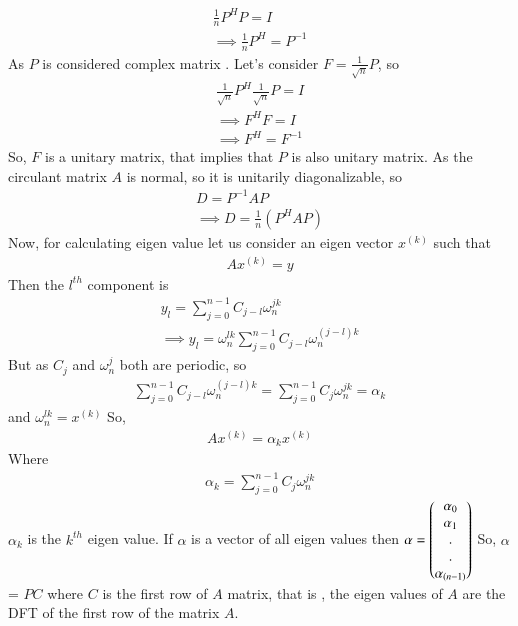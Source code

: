 \documentclass[journal,12pt,twocolumn]{IEEEtran}
\renewcommand\thesection{\arabic{section}}
\begin{document}
\begin{align}
\frac{1}{n}P^H P=I\\
\implies \frac{1}{n}P^H = P^{-1}
\end{align}  
As $P$ is considered complex matrix .
Let's consider $F = \frac{1}{\sqrt{n}}P$, so 
\begin{align}
\frac{1}{\sqrt{n}}P^H \frac{1}{\sqrt{n}}P=I\\
\implies F^H F = I\\
\implies F^H = F^{-1}
\end{align}
So, $F$ is a unitary matrix, that implies that $P$ is also unitary matrix.
As the circulant matrix $A$ is normal, so it is unitarily diagonalizable, so
\begin{align}
D = P^{-1} A P\\
\implies D = \frac{1}{n}(P^H A P)
\end{align}
Now, for calculating eigen value let us consider an eigen vector $x^{(k)}$ such that
\begin{align}
Ax^{(k)}= y 
\end{align} 
Then the $l^{th}$ component is 
\begin{align}
y_l = \sum_{j=0}^{n-1} C_{j-l} \omega_n^{jk}\\
\implies y_l = \omega_n^{lk} \sum_{j=0}^{n-1}C_{j-l} \omega_n^{(j-l)k}
\end{align} 
But as $C_j$ and $\omega_n^j$ both are periodic, so 
\begin{align}
\sum_{j=0}^{n-1}C_{j-l} \omega_n^{(j-l)k} = \sum_{j=0}^{n-1} C_j \omega_n^{jk} = \alpha_k
\end{align} 
and $\omega_n^{lk}=x^{(k)}$
So,
\begin{align}
A x^{(k)} = \alpha_k x^{(k)}
\end{align} 
Where 
\begin{align}
\alpha_k = \sum_{j=0}^{n-1} C_j \omega_n^{jk}
\end{align} 
$\alpha_k$ is the $k^{th}$ eigen value. If $\alpha$ is a vector of all eigen values then $\alpha = \begin{pmatrix}\alpha_0\\\alpha_1\\.\\.\\\alpha_{(n-1)}\end{pmatrix}$
So, $\alpha$ = $PC$ where $C$ is the first row of $A$ matrix, that is , the eigen values of $A$ are the DFT of the first row of the matrix $A$.
%
\end{document}
